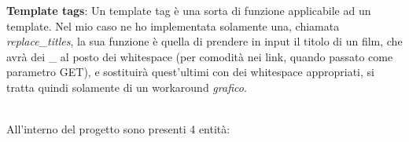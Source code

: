 \documentclass[12pt]{article}
\begin{document}
	\noindent \textbf{Template tags}: Un template tag è una sorta di funzione applicabile ad un template. Nel mio caso ne ho implementata solamente una, chiamata \textit{replace\_titles}, la sua funzione è quella di prendere in input il titolo di un film, che avrà dei \_ al posto dei whitespace (per comodità nei link, quando passato come parametro GET), e sostituirà quest'ultimi con dei whitespace appropriati, si tratta quindi solamente di un workaround \textit{grafico}. \\ \\
	
	\pagebreak
	
	\noindent All'interno del progetto sono presenti 4 entità:
	
\end{document}
